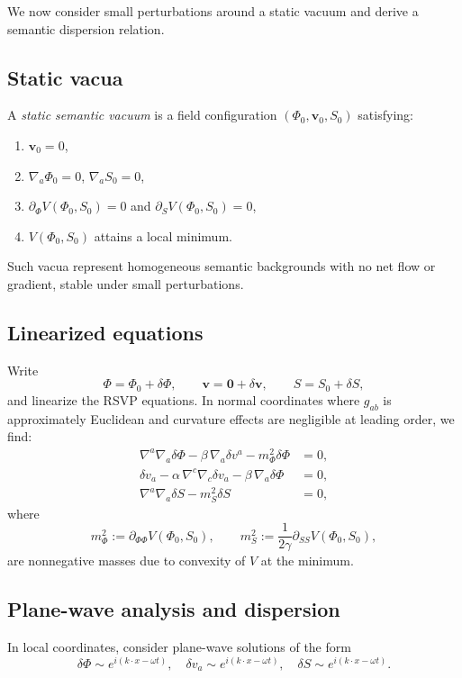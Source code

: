 We now consider small perturbations around a static vacuum and derive a semantic
dispersion relation.

\subsection{Static vacua}

A \emph{static semantic vacuum} is a field configuration
$(\Phi_0,\mathbf{v}_0,S_0)$ satisfying:

\begin{enumerate}
  \item $\mathbf{v}_0 = 0$,
  \item $\nabla_a \Phi_0 = 0$, $\nabla_a S_0 = 0$,
  \item $\partial_\Phi V(\Phi_0,S_0) = 0$ and $\partial_S V(\Phi_0,S_0) = 0$,
  \item $V(\Phi_0,S_0)$ attains a local minimum.
\end{enumerate}

Such vacua represent homogeneous semantic backgrounds with no net flow or
gradient, stable under small perturbations.

\subsection{Linearized equations}

Write
\[
\Phi = \Phi_0 + \delta\Phi,
\qquad
\mathbf{v} = \mathbf{0} + \delta\mathbf{v},
\qquad
S = S_0 + \delta S,
\]
and linearize the RSVP equations. In normal coordinates where $g_{ab}$ is
approximately Euclidean and curvature effects are negligible at leading order,
we find:
\begin{align}
\nabla^a \nabla_a \delta\Phi
 - \beta\, \nabla_a \delta v^a
 - m_\Phi^2 \delta\Phi &= 0, \\
\delta v_a
 - \alpha\, \nabla^c \nabla_c \delta v_a
 - \beta\, \nabla_a \delta\Phi &= 0, \\
\nabla^a \nabla_a \delta S
 - m_S^2 \delta S &= 0,
\end{align}
where
\[
m_\Phi^2 := \partial_{\Phi\Phi} V(\Phi_0,S_0),
\qquad
m_S^2 := \frac{1}{2\gamma}\partial_{SS} V(\Phi_0,S_0),
\]
are nonnegative masses due to convexity of $V$ at the minimum.

\subsection{Plane-wave analysis and dispersion}

In local coordinates, consider plane-wave solutions of the form
\[
\delta\Phi \sim e^{i(k\cdot x - \omega t)},
\quad
\delta v_a \sim e^{i(k\cdot x - \omega t)},
\quad
\delta S \sim e^{i(k\cdot x - \omega t)}.
\]

